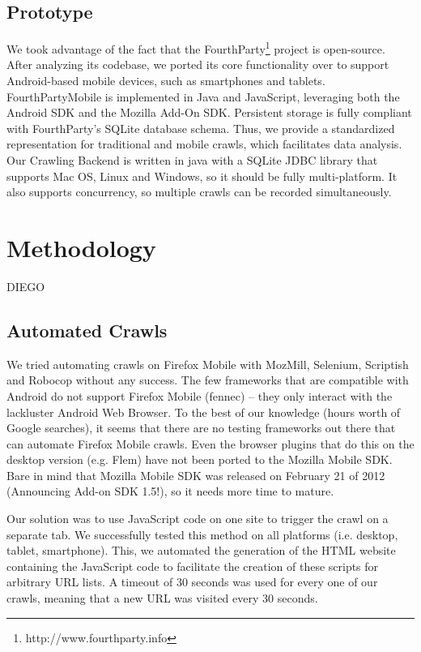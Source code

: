 \documentclass{acm_proc_article-sp}
\begin{document}
\subsection{Prototype}
We took advantage of the fact that the FourthParty\footnote{http://www.fourthparty.info} project is open-source. After analyzing its codebase, we ported its core functionality over to support Android-based mobile devices, such as smartphones and tablets. FourthPartyMobile is implemented in Java and JavaScript, leveraging both the Android SDK and the Mozilla Add-On SDK. Persistent storage is fully compliant with FourthParty's SQLite database schema. Thus, we provide a standardized representation for traditional and mobile crawls, which facilitates data analysis. Our Crawling Backend is written in java with a SQLite JDBC library that supports Mac OS, Linux and Windows, so it should be fully multi-platform. It also supports concurrency, so multiple crawls can be recorded simultaneously. 

\section{Methodology}
DIEGO

\subsection{Automated Crawls}

We tried automating crawls on Firefox Mobile with MozMill, Selenium, Scriptish and Robocop without any success. The few frameworks that are compatible with Android do not support Firefox Mobile (fennec) – they only interact with the lackluster Android Web Browser. To the best of our knowledge (hours worth of Google searches), it seems that there are no testing frameworks out there that can automate Firefox Mobile crawls. Even the browser plugins that do this on the desktop version (e.g. Flem) have not been ported to the Mozilla Mobile SDK. Bare in mind that Mozilla Mobile SDK was released on February 21 of 2012 (Announcing Add-on SDK 1.5!), so it needs more time to mature.

Our solution was to use JavaScript code on one site to trigger the crawl on a separate tab. We successfully tested this method on all platforms (i.e. desktop, tablet, smartphone). This, we automated the generation of the HTML website containing the JavaScript code to facilitate the creation of these scripts for arbitrary URL lists. A timeout of 30 seconds was used for every one of our crawls, meaning that a new URL was visited every 30 seconds.
\end{document}
